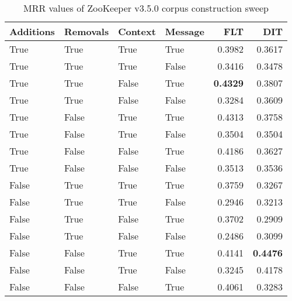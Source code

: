 
\begin{table}
\begin{spacing}{1.2}
\centering
\caption{MRR values of ZooKeeper v3.5.0 corpus construction sweep}
\label{table:zookeeper_corpus_sweep}
\vspace{0.2em}
\begin{tabular}{llll|rr}
\toprule
Additions & Removals & Context & Message & FLT &       DIT \\
\midrule
     True &     True &    True &    True &           0.3982 &       0.3617 \\
     True &     True &    True &   False &           0.3416 &       0.3478 \\
     True &     True &   False &    True &     {\bf 0.4329} &       0.3807 \\
     True &     True &   False &   False &           0.3284 &       0.3609 \\
     True &    False &    True &    True &           0.4313 &       0.3758 \\
     True &    False &    True &   False &           0.3504 &       0.3504 \\
     True &    False &   False &    True &           0.4186 &       0.3627 \\
     True &    False &   False &   False &           0.3513 &       0.3536 \\
    False &     True &    True &    True &           0.3759 &       0.3267 \\
    False &     True &    True &   False &           0.2946 &       0.3213 \\
    False &     True &   False &    True &           0.3702 &       0.2909 \\
    False &     True &   False &   False &           0.2486 &       0.3099 \\
    False &    False &    True &    True &           0.4141 & {\bf 0.4476} \\
    False &    False &    True &   False &           0.3245 &       0.4178 \\
    False &    False &   False &    True &           0.4061 &       0.3283 \\
\bottomrule
\end{tabular}

\end{spacing}
\end{table}
